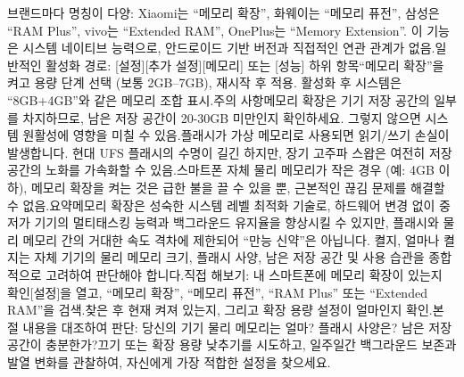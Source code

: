 브랜드마다 명칭이 다양: Xiaomi는 “메모리 확장”, 화웨이는 “메모리 퓨전”, 삼성은 “RAM Plus”, vivo는 “Extended RAM”, OnePlus는 “Memory Extension”. 이 기능은 시스템 네이티브 능력으로, 안드로이드 기반 버전과 직접적인 연관 관계가 없음.일반적인 활성화 경로: [설정][추가 설정][메모리] 또는 [성능] 하위 항목“메모리 확장”을 켜고 용량 단계 선택 (보통 2GB–7GB), 재시작 후 적용. 활성화 후 시스템은 “8GB+4GB”와 같은 메모리 조합 표시.주의 사항메모리 확장은 기기 저장 공간의 일부를 차지하므로, 남은 저장 공간이 20-30GB 미만인지 확인하세요. 그렇지 않으면 시스템 원활성에 영향을 미칠 수 있음.플래시가 가상 메모리로 사용되면 읽기/쓰기 손실이 발생합니다. 현대 UFS 플래시의 수명이 길긴 하지만, 장기 고주파 스왑은 여전히 저장 공간의 노화를 가속화할 수 있음.스마트폰 자체 물리 메모리가 작은 경우 (예: 4GB 이하), 메모리 확장을 켜는 것은 급한 불을 끌 수 있을 뿐, 근본적인 끊김 문제를 해결할 수 없음.요약메모리 확장은 성숙한 시스템 레벨 최적화 기술로, 하드웨어 변경 없이 중저가 기기의 멀티태스킹 능력과 백그라운드 유지율을 향상시킬 수 있지만, 플래시와 물리 메모리 간의 거대한 속도 격차에 제한되어 “만능 신약”은 아닙니다. 켤지, 얼마나 켤지는 자체 기기의 물리 메모리 크기, 플래시 사양, 남은 저장 공간 및 사용 습관을 종합적으로 고려하여 판단해야 합니다.직접 해보기: 내 스마트폰에 메모리 확장이 있는지 확인[설정]을 열고, “메모리 확장”, “메모리 퓨전”, “RAM Plus” 또는 “Extended RAM”을 검색.찾은 후 현재 켜져 있는지, 그리고 확장 용량 설정이 얼마인지 확인.본 절 내용을 대조하여 판단: 당신의 기기 물리 메모리는 얼마? 플래시 사양은? 남은 저장 공간이 충분한가?끄기 또는 확장 용량 낮추기를 시도하고, 일주일간 백그라운드 보존과 발열 변화를 관찰하여, 자신에게 가장 적합한 설정을 찾으세요.
